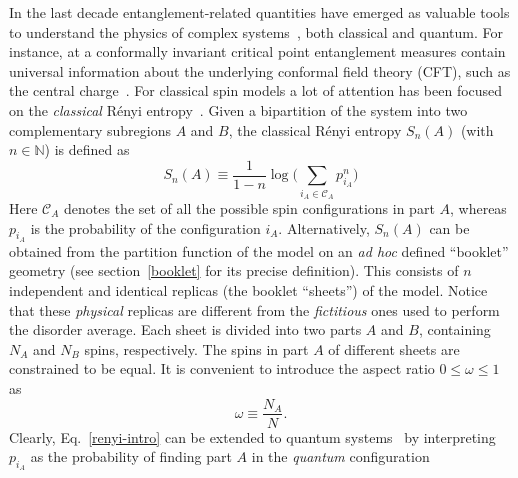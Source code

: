 \documentclass[twocolumn,superscriptaddress,prb,10pt]{revtex4-1}
\begin{document}
In the last decade entanglement-related quantities have emerged as valuable tools to 
understand the physics of complex systems~\cite{amico-2008,eisert-2009,calabrese-2009,
cc-rev}, both classical and quantum. For instance, at a conformally invariant critical 
point entanglement measures contain universal information about the underlying 
conformal field theory (CFT), such as the central charge~\cite{holzhey-1994,vidal-2003,
calabrese-2004,calabrese-2012}. For classical spin models a lot of attention has been 
focused on the \emph{classical} R\'enyi entropy~\cite{jaconis-2013,stephan-2014}. Given 
a bipartition of the system into two complementary subregions $A$ and $B$, the classical 
R\'enyi entropy $S_n(A)$ (with $n\in\mathbb{N}$) is defined as 
%
\begin{equation}
S_n(A)\equiv \frac{1}{1-n}\log\Big(\sum\limits_{i_A\in{\mathcal C}_A} p^n_{i_A}
\Big)
\label{renyi-intro}
\end{equation}
%
Here ${\mathcal C}_A$ denotes the set of all the possible spin configurations in part 
$A$, whereas $p_{i_A}$ is the probability of the configuration $i_A$. 
Alternatively, $S_n(A)$ can be obtained from the partition function of the model on 
an \emph{ad hoc} defined ``booklet'' geometry (see section~\ref{booklet} for its 
precise definition). This consists of $n$ independent and identical replicas (the 
booklet ``sheets'') of the model. Notice that these \emph{physical} replicas are different 
from the \emph{fictitious} ones used to perform the disorder average. Each sheet is 
divided into two parts $A$ and $B$, containing $N_A$ and $N_B$ spins, respectively. 
The spins in part $A$ of different sheets are constrained to be equal. It is 
convenient to introduce the aspect ratio $0\le\omega\le1$ as  
%
\begin{equation}
\label{a-ratio}
\omega\equiv \frac{N_A}{N}.
\end{equation}
%
Clearly,  Eq.~\eqref{renyi-intro} can be extended to quantum systems~\cite{stephan-2009,
stephan-2010,stephan-2011,zaletel-2011,alcaraz-2013,stephan-2014-a} by interpreting 
$p_{i_A}$ as the probability of finding part $A$ in the \emph{quantum} configuration 
\end{document}
